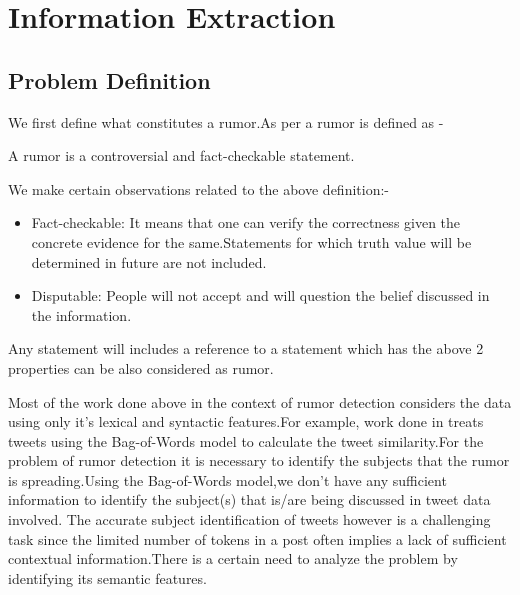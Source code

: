 \chapter{Information Extraction}

			\section{Problem Definition}

			\par
			We first define what constitutes a rumor.As per \cite{difonzo2007rumor} a rumor is defined as -
			\begin{center}
					A rumor is a controversial and fact-checkable statement.
			\end{center}
			We make certain observations related to the above definition:-
			\begin{itemize}
				\item Fact-checkable: It means that one can verify the correctness given the concrete evidence for the same.Statements for which truth value will be determined in future are not included.
				
				\item 
				Disputable: People will not accept and will question the belief discussed in the information.
			\end{itemize}
			Any statement will includes a reference to a statement which has the above 2 properties can be also considered as rumor.
			\\
			\par
			Most of the work done above in the context of rumor detection considers the data using only it's lexical and syntactic features.For example, work done in \cite{zhao2015enquiring} treats tweets using the Bag-of-Words model to calculate the tweet similarity.For the problem of rumor detection it is necessary to identify the subjects that the rumor is spreading.Using the Bag-of-Words model,we don't have any sufficient information to identify the subject(s) that is/are being discussed  in tweet data involved. The accurate subject identification of tweets however is a challenging task since the limited number of tokens in a post often implies a lack of sufficient	contextual information.There is a certain need to analyze the problem by identifying its semantic features.\\
		
